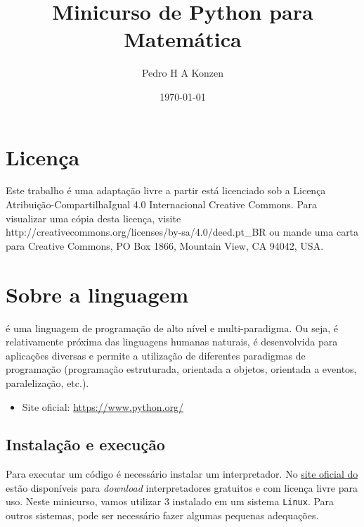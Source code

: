 \documentclass[12pt]{article}
\begin{document}
\title{Minicurso de Python para Matemática}
\author{Pedro H A Konzen}
\date{\today}

\maketitle

\nocite{Banin, NumPy, PythonTutorial, Ribeiro, TutorialsPoint, SciPy, Wazlawick}

\tableofcontents

\section*{Licença}\label{sec_licenca}

Este trabalho é uma adaptação livre a partir está licenciado sob a Licença Atribuição-CompartilhaIgual 4.0 Internacional Creative Commons. Para visualizar uma cópia desta licença, visite http://creativecommons.org/licenses/by-sa/4.0/deed.pt\_BR ou mande uma carta para Creative Commons, PO Box 1866, Mountain View, CA 94042, USA.


\section{Sobre a linguagem}\label{sec_sobrepy}

{\python} é uma linguagem de programação de alto nível e multi-paradigma. Ou seja, é relativamente próxima das linguagens humanas naturais, é desenvolvida para aplicações diversas e permite a utilização de diferentes paradigmas de programação (programação estruturada, orientada a objetos, orientada a eventos, paralelização, etc.).

\begin{itemize}
\item Site oficial: \href{https://www.python.org/}{https://www.python.org/}
\end{itemize}

\subsection{Instalação e execução}

Para executar um código {\python} é necessário instalar um interpretador. No \href{https://www.python.org/}{site oficial do \python} estão disponíveis para {\it download} interpretadores gratuitos e com licença livre para uso. Neste minicurso, vamos utilizar {\python} 3 instalado em um sistema \verb+Linux+. Para outros sistemas, pode ser necessário fazer algumas pequenas adequações.
\end{document}
